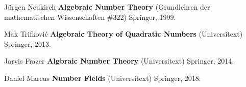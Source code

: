 \documentclass[12pt]{article}
\begin{document}
\begin{thebibliography}{}

\item J\"{u}rgen Neukirch \textbf{Algebraic Number Theory} (Grundlehren der mathematischen Wissenschaften \#322) Springer, 1999.


\item Mak Trifkovi\'{c} \textbf{Algebraic Theory of Quadratic Numbers} (Universitext) Springer, 2013.

\item Jarvis Frazer \textbf{Algbraic Number Theory} (Universitext) Springer, 2014.

\item Daniel Marcus \textbf{Number Fields} (Universitext) Springer, 2018.
\end{thebibliography}
\end{document}
